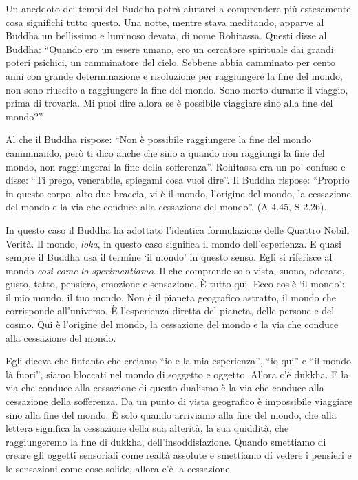 Un aneddoto dei tempi del Buddha potrà aiutarci a comprendere più estesamente cosa significhi tutto questo. Una notte, mentre stava meditando, apparve al Buddha un bellissimo e luminoso devata, di nome Rohitassa. Questi disse al Buddha: ``Quando ero un essere umano, ero un cercatore spirituale dai grandi poteri psichici, un camminatore del cielo. Sebbene abbia camminato per cento anni con grande determinazione e risoluzione per raggiungere la fine del mondo, non sono riuscito a raggiungere la fine del mondo. Sono morto durante il viaggio, prima di trovarla. Mi puoi dire allora se è possibile viaggiare sino alla fine del mondo?''.

Al che il Buddha rispose: ``Non è possibile raggiungere la fine del mondo camminando, però ti dico anche che sino a quando non raggiungi la fine del mondo, non raggiungerai la fine della sofferenza''. Rohitassa era un po' confuso e disse: ``Ti prego, venerabile, spiegami cosa vuoi dire''. Il Buddha rispose: ``Proprio in questo corpo, alto due braccia, vi è il mondo, l'origine del mondo, la cessazione del mondo e la via che conduce alla cessazione del mondo''. (A 4.45, S 2.26).

In questo caso il Buddha ha adottato l'identica formulazione delle Quattro Nobili Verità. Il mondo, \textit{loka}, in questo caso significa il mondo dell'esperienza. E quasi sempre il Buddha usa il termine `il mondo' in questo senso. Egli si riferisce al mondo \textit{così come lo sperimentiamo}. Il che comprende solo vista, suono, odorato, gusto, tatto, pensiero, emozione e sensazione. È tutto qui. Ecco cos'è `il mondo': il mio mondo, il tuo mondo. Non è il pianeta geografico astratto, il mondo che corrisponde all'universo. È l'esperienza diretta del pianeta, delle persone e del cosmo. Qui è l'origine del mondo, la cessazione del mondo e la via che conduce alla cessazione del mondo.

Egli diceva che fintanto che creiamo ``io e la mia esperienza'', ``io qui'' e ``il mondo là fuori'', siamo bloccati nel mondo di soggetto e oggetto. Allora c'è dukkha. E la via che conduce alla cessazione di questo dualismo è la via che conduce alla cessazione della sofferenza. Da un punto di vista geografico è impossibile viaggiare sino alla fine del mondo. È solo quando arriviamo alla fine del mondo, che alla lettera significa la cessazione della sua alterità, la sua quiddità, che raggiungeremo la fine di dukkha, dell'insoddisfazione. Quando smettiamo di creare gli oggetti sensoriali come realtà assolute e smettiamo di vedere i pensieri e le sensazioni come cose solide, allora c'è la cessazione. 

